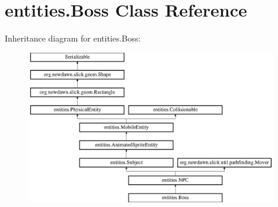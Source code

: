 \hypertarget{classentities_1_1_boss}{}\section{entities.\+Boss Class Reference}
\label{classentities_1_1_boss}
Inheritance diagram for entities.\+Boss\+:\begin{figure}[H]
\begin{center}
\leavevmode
\includegraphics[height=6.666667cm]{classentities_1_1_boss}
\end{center}
\end{figure}
